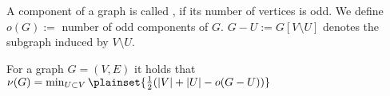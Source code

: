 \begin{lec}[2011-11-10]\end{lec}



\begin{defn}
	A component of a graph is called , if its number 
	of vertices is odd. We define $o(G):=$ number of odd components of $G$. 
	$G-U:=G[V \setminus U]$ denotes the subgraph induced by $V \setminus U$.
\end{defn}

\begin{thm}
	For a graph $G=(V,E)$ it holds that $\nu(G)=\min_{U \subset V} \plainset{\frac{1}{2}(|V|+|U|-o(G-U))}$
\end{thm}
	
